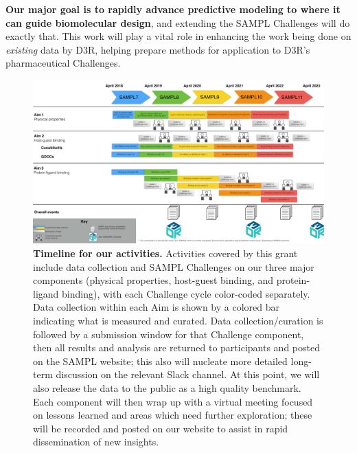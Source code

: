 \documentclass[11pt]{article}
\begin{document}
\textbf{Our major goal is to rapidly advance predictive modeling to where it can guide biomolecular design}, and extending the SAMPL Challenges will do exactly that. This work will play a vital role in enhancing the work being done on \emph{existing} data by D3R, helping prepare methods for application to D3R's pharmaceutical Challenges. 


\begin{figure}[h]
\vspace{-0.10in}
\begin{centering}
\includegraphics[width=\textwidth]{figures/Timeline3_cropped.pdf}
\end{centering}
\vspace{-0.25in}
\caption{\footnotesize {\bf Timeline for our activities.} Activities covered by this grant include data collection and SAMPL Challenges on our three major components (physical properties, host-guest binding, and protein-ligand binding), with each Challenge cycle color-coded separately.  
Data collection within each Aim is shown by a colored bar indicating what is measured and curated.
Data collection/curation is followed by a submission window for that Challenge component, then all results and analysis are returned to participants and posted on the SAMPL website; this also will nucleate more detailed long-term discussion on the relevant Slack channel.
At this point, we will also release the data to the public as a high quality benchmark.
Each component will then wrap up with a virtual meeting focused on lessons learned and areas which need further exploration; these will be recorded and posted on our website to assist in rapid dissemination of new insights. 
}
\end{figure}
\end{document}

